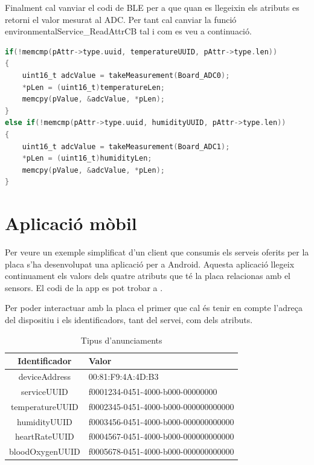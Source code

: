 Finalment cal vanviar el codi de BLE per a que quan es llegeixin els atributs es retorni el valor mesurat al ADC.
Per tant cal canviar la funció environmentalService\_ReadAttrCB tal i com es veu a continuació.

\begin{lstlisting}[language=C]
  if(!memcmp(pAttr->type.uuid, temperatureUUID, pAttr->type.len))
{
	uint16_t adcValue = takeMeasurement(Board_ADC0);
	*pLen = (uint16_t)temperatureLen;
	memcpy(pValue, &adcValue, *pLen);
}
else if(!memcmp(pAttr->type.uuid, humidityUUID, pAttr->type.len))
{
	uint16_t adcValue = takeMeasurement(Board_ADC1);
	*pLen = (uint16_t)humidityLen;
	memcpy(pValue, &adcValue, *pLen);
}
\end{lstlisting}

\section{Aplicació mòbil}
Per veure un exemple simplificat d'un client que consumis els serveis oferits per la placa s'ha desenvolupat una aplicació per a Android.
Aquesta aplicació llegeix continuament els valors dels quatre atributs que té la placa relacionas amb el sensors.
El codi de la app es pot trobar a \cite{android_repo}.

Per poder interactuar amb la placa el primer que cal és tenir en compte l'adreça del dispositiu i els identificadors, tant del servei, com dels atributs. 

\begin{table}[!h]
	\begin{center}
		\begin{tabular}{|c|l|}
			\hline
			Identificador	&	Valor	\\	\hline
			deviceAddress	&	00:81:F9:4A:4D:B3	\\	\hline
			serviceUUID		&	f0001234-0451-4000-b000-00000000		\\	\hline
			temperatureUUID	&	f0002345-0451-4000-b000-000000000000	\\	\hline
			humidityUUID	&	f0003456-0451-4000-b000-000000000000	\\	\hline
			heartRateUUID	&	f0004567-0451-4000-b000-000000000000	\\	\hline
			bloodOxygenUUID	&	f0005678-0451-4000-b000-000000000000	\\	\hline
		\end{tabular}
	\end{center}
	\caption{Tipus d'anunciaments}
\end{table}

